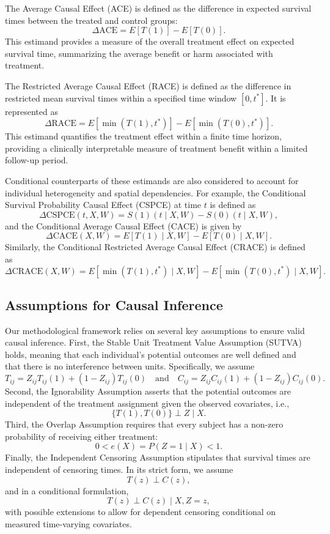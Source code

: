 \documentclass[useAMS,referee]{biom}
\begin{document}
The Average Causal Effect (ACE) is defined as the difference in expected survival times between the treated and control groups:
\[
\Delta \text{ACE} = E[T(1)] - E[T(0)].
\]
This estimand provides a measure of the overall treatment effect on expected survival time, summarizing the average benefit or harm associated with treatment.

The Restricted Average Causal Effect (RACE) is defined as the difference in restricted mean survival times within a specified time window \( [0, t^*] \). It is represented as 
\[
\Delta \text{RACE} = E[\min(T(1), t^*)] - E[\min(T(0), t^*)].
\]
This estimand quantifies the treatment effect within a finite time horizon, providing a clinically interpretable measure of treatment benefit within a limited follow-up period.

Conditional counterparts of these estimands are also considered to account for individual heterogeneity and spatial dependencies. For example, the Conditional Survival Probability Causal Effect (CSPCE) at time \( t \) is defined as 
\[
\Delta \text{CSPCE}(t, X, W) = S(1)(t \mid X, W) - S(0)(t \mid X, W),
\]
and the Conditional Average Causal Effect (CACE) is given by 
\[
\Delta \text{CACE}(X, W) = E[T(1) \mid X, W] - E[T(0) \mid X, W].
\]
Similarly, the Conditional Restricted Average Causal Effect (CRACE) is defined as 
\[
\Delta \text{CRACE}(X, W) = E[\min(T(1), t^*) \mid X, W] - E[\min(T(0), t^*) \mid X, W].
\]

\subsection{Assumptions for Causal Inference}
Our methodological framework relies on several key assumptions to ensure valid causal inference. First, the Stable Unit Treatment Value Assumption (SUTVA) holds, meaning that each individual’s potential outcomes are well defined and that there is no interference between units. Specifically, we assume 
\[
T_{ij} = Z_{ij} T_{ij}(1) + (1 - Z_{ij}) T_{ij}(0) \quad \text{and} \quad C_{ij} = Z_{ij} C_{ij}(1) + (1 - Z_{ij}) C_{ij}(0).
\]
Second, the Ignorability Assumption asserts that the potential outcomes are independent of the treatment assignment given the observed covariates, i.e., 
\[
\{T(1), T(0)\} \perp Z \mid X.
\]
Third, the Overlap Assumption requires that every subject has a non-zero probability of receiving either treatment:
\[
0 < e(X) = P(Z = 1 \mid X) < 1.
\]
Finally, the Independent Censoring Assumption stipulates that survival times are independent of censoring times. In its strict form, we assume 
\[
T(z) \perp C(z),
\]
and in a conditional formulation, 
\[
T(z) \perp C(z) \mid X, Z=z,
\]
with possible extensions to allow for dependent censoring conditional on measured time-varying covariates.
\end{document}
